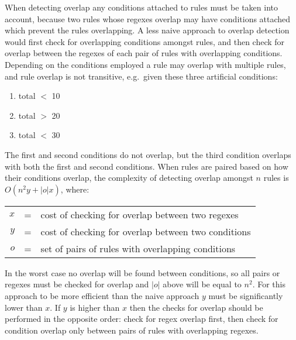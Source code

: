 When detecting overlap any conditions attached to rules must be taken into
account, because two rules whose regexes overlap may have conditions
attached which prevent the rules overlapping.  A less naive approach to
overlap detection would first check for overlapping conditions amongst
rules, and then check for overlap between the regexes of each pair of rules
with overlapping conditions.  Depending on the conditions employed a rule
may overlap with multiple rules, and rule overlap is not transitive, e.g.\
given these three artificial conditions:

\begin{enumerate}

    \squeezeitems{}

    \item total $<$ 10

    \item total $>$ 20

    \item total $<$ 30

\end{enumerate}

\noindent{}The first and second conditions do not overlap, but the third
condition overlaps with both the first and second conditions.  When rules
are paired based on how their conditions overlap, the complexity of
detecting overlap amongst $n$ rules is $O\left(n^{2}y+|o|x\right)$, where:

\begin{tabular}[]{rcl}

    $x$ & = & cost of checking for overlap between two regexes    \\
    $y$ & = & cost of checking for overlap between two conditions \\
    $o$ & = & set of pairs of rules with overlapping conditions   \\

\end{tabular}

In the worst case no overlap will be found between conditions, so all pairs
or regexes must be checked for overlap and $|o|$ above will be equal to
$n^{2}$.  For this approach to be more efficient than the naive approach
$y$ must be significantly lower than $x$.  If $y$ is higher than $x$ then
the checks for overlap should be performed in the opposite order: check for
regex overlap first, then check for condition overlap only between pairs of
rules with overlapping regexes.

